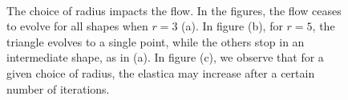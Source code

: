 \documentclass[smallextended]{svjour3}       %
\begin{document}
{\begin{figure}[hp!]
{		\hspace{15pt}
		}\\
\caption{The choice of radius impacts the flow. In the figures, the flow ceases to evolve for all shapes  when $r=3$ (a). In figure (b), for $r=5$, the triangle evolves to a single point, while the others stop  in an intermediate shape, as in (a). In figure (c), we observe that for a given choice of radius, the elastica may increase after a certain number of iterations. }
\label{fig:mx-flow-gs-radius-effect}
\end{figure}


}
\end{document}

